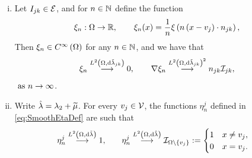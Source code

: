 \begin{lemma} \label{lem:SI-SmoothFunctionsResults}
	\begin{enumerate}[(i)]
		\item Let $I_{jk}\in\mathcal{E}$, and for $n\in\mathbb{N}$ define the function
		\begin{align*}
			\xi_n:\Omega\rightarrow\mathbb{R}, \qquad \xi_n(x) = \frac{1}{n}\xi\left( n\left( x-v_j \right)\cdot n_{jk} \right),
		\end{align*}
		Then $\xi_n\in C^{\infty}\left( \Omega \right)$ for any $n\in\mathbb{N}$, and we have that
		\begin{align*}
			\xi_n \overset{L^{2}\left( \Omega,\mathrm{d}\tilde{\lambda}_{jk} \right)}{\longrightarrow} 0, \qquad
			\nabla\xi_n \overset{L^{2}\left( \Omega,\mathrm{d}\tilde{\lambda}_{jk} \right)^2}{\longrightarrow} n_{jk}\mathcal{I}_{jk},
		\end{align*}
		$\ \text{as} \ n \rightarrow\infty$.
		\item Write $\hat{\lambda} = \lambda_2 + \widetilde{\mu}$.
		For every $v_j\in\mathcal{V}$, the functions $\eta_n^j$ defined in \eqref{eq:SmoothEtaDef} are such that
		\begin{align*}
			\eta_n^j \overset{L^{2}\left( \Omega,\mathrm{d}\tilde{\lambda} \right)}{\longrightarrow} 1,
			&\qquad
			\eta_n^j \overset{L^{2}\left( \Omega,\mathrm{d}\hat{\lambda} \right)}{\longrightarrow} \mathcal{I}_{\Omega\setminus\left\{ v_j \right\}} := \begin{cases} 1 & x\neq v_j, \\ 0 & x=v_j. \end{cases}
		\end{align*}
	\end{enumerate}
\end{lemma}
